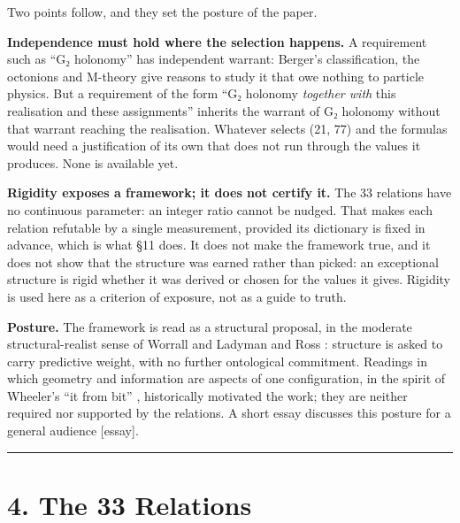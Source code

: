 \documentclass[11pt,a4paper]{article}
\begin{document}
Two points follow, and they set the posture of the paper.

\textbf{Independence must hold where the selection happens.} A requirement such as ``G₂ holonomy'' has independent warrant: Berger's classification, the octonions and M-theory give reasons to study it that owe nothing to particle physics. But a requirement of the form ``G₂ holonomy \emph{together with} this realisation and these assignments'' inherits the warrant of G₂ holonomy without that warrant reaching the realisation. Whatever selects (21, 77) and the formulas would need a justification of its own that does not run through the values it produces. None is available yet.

\textbf{Rigidity exposes a framework; it does not certify it.} The 33 relations have no continuous parameter: an integer ratio cannot be nudged. That makes each relation refutable by a single measurement, provided its dictionary is fixed in advance, which is what §11 does. It does not make the framework true, and it does not show that the structure was earned rather than picked: an exceptional structure is rigid whether it was derived or chosen for the values it gives. Rigidity is used here as a criterion of exposure, not as a guide to truth.

\textbf{Posture.} The framework is read as a structural proposal, in the moderate structural-realist sense of Worrall \cite{40} and Ladyman and Ross \cite{41}: structure is asked to carry predictive weight, with no further ontological commitment. Readings in which geometry and information are aspects of one configuration, in the spirit of Wheeler's ``it from bit'' \cite{39}, historically motivated the work; they are neither required nor supported by the relations. A short essay discusses this posture for a general audience {[}essay{]}.

\begin{center}\rule{\linewidth}{0.5pt}\end{center}

\section{4. The 33 Relations}\label{the-33-relations}
\end{document}

